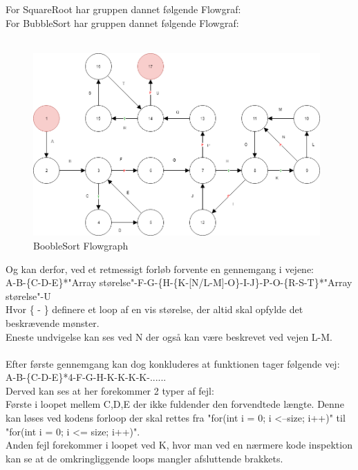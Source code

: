 \documentclass[11pt]{article}
\begin{document}
    \noindent
    For SquareRoot har gruppen dannet følgende Flowgraf:
    \\
    \noindent
    For BubbleSort har gruppen dannet følgende Flowgraf:\\\\
    \begin{subfigure}{1\textwidth}
        \centering
        \includegraphics[width=1\linewidth, height=7cm]{Struktureret_System_Udvikling/Workshop_3/Booble_Sort_Flowgraph.png}
        \caption{BoobleSort Flowgraph}
        \label{fig:BoobleSortGraph}
    \end{subfigure}
    Og kan derfor, ved et retmessigt forløb forvente en gennemgang i vejene:\\
    A-B-\{C-D-E\}*"Array størelse"-F-G-\{H-\{K-[N/L-M]-O\}-I-J\}-P-O-\{R-S-T\}*"Array størelse"-U\\
    Hvor \{ - \} definere et loop af en vis størelse, der altid skal opfylde det beskrævende mønster.\\
    Eneste undvigelse kan ses ved N der også kan være beskrevet ved vejen L-M.\\
    \\
    Efter første gennemgang kan dog konkluderes at funktionen tager følgende vej:\\
    A-B-\{C-D-E\}*4-F-G-H-K-K-K-K-......\\
    Derved kan ses at her forekommer 2 typer af fejl:\\
    Første i loopet mellem C,D,E der ikke fuldender den forvendtede længte. Denne kan løses ved kodens forloop der skal rettes fra "for(int i = 0; i \textless --size; i++)" til "for(int i = 0; i \textless= size; i++)".\\
    Anden fejl forekommer i loopet ved K, hvor man ved en nærmere kode inspektion kan se at de omkringliggende loops mangler afsluttende brakkets.\\
\end{document}
